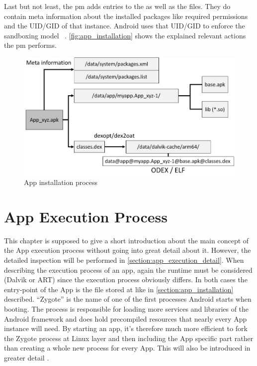 Last but not least, the pm adds entries to the
 as well as the
 files. They do contain
meta information about the installed packages like
required permissions and the UID/GID of that instance.
Android uses that UID/GID to enforce the sandboxing model
~\parencite[ch.1]{securityinternals}.
\autoref{fig:app_installation} shows the explained
relevant actions the pm performs.

\begin{figure}[htb]
  \includegraphics[width=\textwidth]{figures/app_installation}
  \caption[App installation process]{App installation process}
  \label{fig:app_installation}
\end{figure}

\section{App Execution Process}\label{section:app_execution_simple}
This chapter is supposed to give a short introduction about the
main concept of the App execution process without going into
great detail about it. However, the detailed inspection will
be performed in \autoref{section:app_execution_detail}.
When describing the execution process of an app, again the
runtime must be considered (Dalvik or ART) since the execution process
obviously differs. In both cases the entry-point of the App is the
file stored at  like in
\autoref{section:app_installation} described. ``Zygote'' is
the name of one of the first processes Android starts when booting.
The process is responsible for loading more services and libraries
of the Android framework and does hold precompiled resources that
nearly every App instance will need.
By starting an app, it's therefore much more efficient to fork
the Zygote process at Linux layer and then including the App specific part
rather than  creating a whole new process for every App.
This will also be introduced in greater detail \parencite[ch.2]{hackershandbook}.

